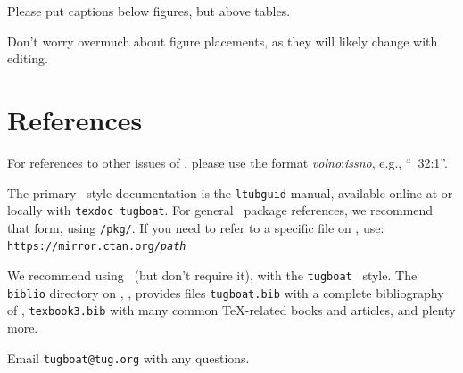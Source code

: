 \documentclass{ltugboat}
\begin{document}
Please put captions below figures, but above tables.

Don't worry overmuch about figure placements, as they will likely change
with editing.

\section{References}

For references to other issues of \TUB, please use the format
\textsl{volno}:\textsl{issno}, e.g., ``\TUB\ 32:1''.

The primary \TUB\ style documentation is the \texttt{ltubguid} manual,
available online at  or locally with
\texttt{texdoc tugboat}. For general \CTAN\ package references, we
recommend that form, using \texttt{/pkg/}. If you need to refer to a
specific file on \CTAN, use:\\
\texttt{https://mirror.ctan.org/\textsl{path}}

We recommend using \BibTeX\ (but don't require it), with the
\texttt{tugboat} \BibTeX\ style. The \texttt{biblio} directory on \CTAN,
, provides files \texttt{tugboat.bib} with a
complete bibliography of \TUB, \texttt{texbook3.bib} with many common
\TeX-related books and articles, and plenty more.

Email \verb|tugboat@tug.org| with any questions.

\fi



\makesignature
\end{document}
